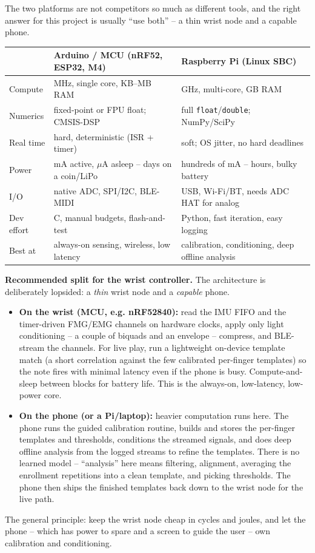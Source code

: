 The two platforms are not competitors so much as different tools, and the right
answer for this project is usually ``use both'' -- a thin wrist node and a capable phone.

\begin{center}
\small
\begin{tabular}{@{}p{2.6cm}p{5.2cm}p{5.2cm}@{}}
\toprule
 & \textbf{Arduino / MCU} (nRF52, ESP32, M4) & \textbf{Raspberry Pi} (Linux SBC) \\
\midrule
Compute & MHz, single core, KB--MB RAM & GHz, multi-core, GB RAM \\
Numerics & fixed-point or FPU float; CMSIS-DSP & full \texttt{float}/\texttt{double}; NumPy/SciPy \\
Real time & hard, deterministic (ISR + timer) & soft; OS jitter, no hard deadlines \\
Power & mA active, $\mu$A asleep -- days on a coin/LiPo & hundreds of mA -- hours, bulky battery \\
I/O & native ADC, SPI/I2C, BLE-MIDI & USB, Wi-Fi/BT, needs ADC HAT for analog \\
Dev effort & C, manual budgets, flash-and-test & Python, fast iteration, easy logging \\
Best at & always-on sensing, wireless, low latency & calibration, conditioning, deep offline analysis \\
\bottomrule
\end{tabular}
\end{center}

\begin{buildbox}
\textbf{Recommended split for the wrist controller.} The architecture is deliberately lopsided: a
\emph{thin} wrist node and a \emph{capable} phone.
\begin{itemize}
  \item \textbf{On the wrist (MCU, e.g. nRF52840):} read the IMU FIFO and the timer-driven FMG/EMG
    channels on hardware clocks, apply only light conditioning -- a couple of biquads and an
    envelope -- compress, and BLE-stream the channels. For live play, run a lightweight on-device
    template match (a short correlation against the few calibrated per-finger templates) so the
    note fires with minimal latency even if the phone is busy. Compute-and-sleep between blocks for
    battery life. This is the always-on, low-latency, low-power core.
  \item \textbf{On the phone (or a Pi/laptop):} heavier computation runs here. The phone runs the
    guided calibration routine, builds and stores the per-finger templates and thresholds,
    conditions the streamed signals, and does deep offline analysis from the logged streams to
    refine the templates. There is no learned model -- ``analysis'' here means filtering, alignment,
    averaging the enrollment repetitions into a clean template, and picking thresholds. The phone
    then ships the finished templates back down to the wrist node for the live path.
\end{itemize}
The general principle: keep the wrist node cheap in cycles and joules, and let the phone -- which
has power to spare and a screen to guide the user -- own calibration and conditioning.
\end{buildbox}

